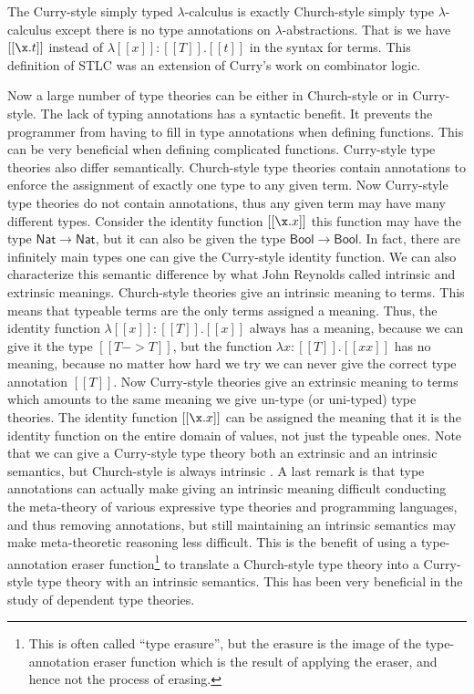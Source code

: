 The Curry-style simply typed $\lambda$-calculus is exactly
Church-style simply type $\lambda$-calculus except there is no type
annotations on $\lambda$-abstractions.  That is we have $[[\x.t]]$
instead of $\lambda [[x]]:[[T]].[[t]]$ in the syntax for terms.  This
definition of STLC was an extension of Curry's work on combinator
logic. 

Now a large number of type theories can be either in Church-style or
in Curry-style.  The lack of typing annotations has a syntactic
benefit.  It prevents the programmer from having to fill in type
annotations when defining functions.  This can be very beneficial when
defining complicated functions.  Curry-style type theories also differ
semantically.  Church-style type theories contain annotations to
enforce the assignment of exactly one type to any given term.  Now
Curry-style type theories do not contain annotations, thus any given
term may have many different types.  Consider the identity function
$[[\x.x]]$ this function may have the type $\mathsf{Nat} \to
\mathsf{Nat}$, but it can also be given the type $\mathsf{Bool} \to
\mathsf{Bool}$. In fact, there are infinitely main types one can give
the Curry-style identity function.  We can also characterize this
semantic difference by what John Reynolds called intrinsic and
extrinsic meanings.  Church-style theories give an intrinsic meaning
to terms.  This means that typeable terms are the only terms assigned
a meaning.  Thus, the identity function $\lambda [[x]]:[[T]].[[x]]$
always has a meaning, because we can give it the type $[[T -> T]]$,
but the function $\lambda x:[[T]].[[x x]]$ has no meaning, because no
matter how hard we try we can never give the correct type annotation
$[[T]]$.  Now Curry-style theories give an extrinsic meaning to terms
which amounts to the same meaning we give un-type (or uni-typed) type
theories.  The identity function $[[\x.x]]$ can be assigned the
meaning that it is the identity function on the entire domain of
values, not just the typeable ones.  Note that we can give a
Curry-style type theory both an extrinsic and an intrinsic semantics,
but Church-style is always intrinsic \cite{Reynolds:2003}.  A last
remark is that type annotations can actually make giving an intrinsic
meaning difficult conducting the meta-theory of various expressive
type theories and programming languages, and thus removing
annotations, but still maintaining an intrinsic semantics may make
meta-theoretic reasoning less difficult.  This is the benefit of using
a type-annotation eraser function\footnote{This is often called ``type
  erasure'', but the erasure is the image of the type-annotation
  eraser function which is the result of applying the eraser, and
  hence not the process of erasing.} to translate a Church-style type
theory into a Curry-style type theory with an intrinsic semantics.
This has been very beneficial in the study of dependent type theories.

